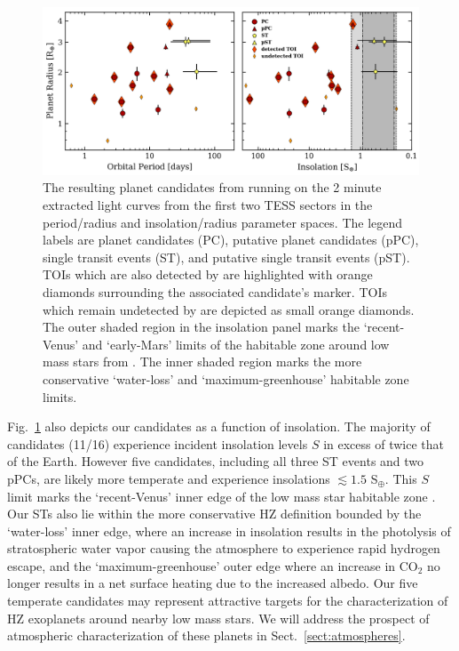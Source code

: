 \begin{figure}
  \centering
  \includegraphics[width=0.9\hsize]{figures/planetsample.png}
  \caption[Planetary parameters for the \texttt{ORION} planet candidate sample.]
      {The resulting planet candidates from running \pipeline{} on the 2 minute extracted light curves
    from the first two TESS sectors in the period/radius and insolation/radius parameter spaces.
    The legend labels are planet candidates (PC), putative planet candidates (pPC), 
    single transit events (ST), and putative single transit events (pST).
    TOIs which are also detected by \pipeline{} are highlighted with
    orange diamonds surrounding the associated candidate's marker. TOIs which remain undetected by \pipeline{}
    are depicted as small orange diamonds. %
    The outer shaded region in the insolation panel marks the `recent-Venus' and `early-Mars'
    limits of the habitable zone around low mass stars from \cite{kopparapu13}. The inner shaded region
    marks the more conservative `water-loss' and `maximum-greenhouse' habitable zone limits.}
  \label{fig:planets}
\end{figure}


Fig.~\ref{fig:planets} also depicts our candidates as a function of insolation. The majority of candidates
(11/16) experience incident insolation levels $S$ in excess of twice that of the Earth. However five candidates,
including all three ST events and two pPCs, are likely more temperate and experience insolations
$\lesssim 1.5$ S$_{\oplus}$.
This $S$ limit marks the `recent-Venus' inner edge of the low mass star habitable zone \citep[HZ;][]{kopparapu13}.
Our STs also lie within the more conservative HZ definition bounded by the `water-loss' inner
edge, where an increase in insolation results in the photolysis of stratospheric water vapor causing the atmosphere
to experience rapid hydrogen escape, and the `maximum-greenhouse' outer edge where an increase in CO$_2$ no longer
results in a net surface heating due to the increased albedo. Our five temperate candidates may represent attractive
targets for the characterization of HZ exoplanets around nearby low mass stars. We will address the prospect of
atmospheric characterization of these planets in Sect.~\ref{sect:atmospheres}. \\

